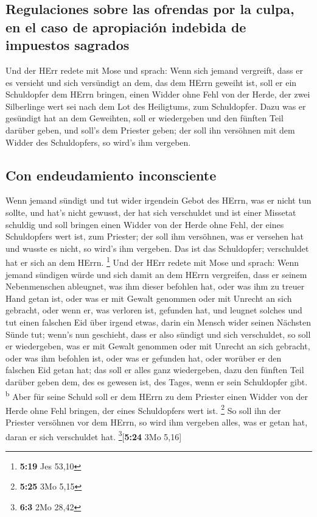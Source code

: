 \hypertarget{regulaciones-sobre-las-ofrendas-por-la-culpa-en-el-caso-de-apropiaciuxf3n-indebida-de-impuestos-sagrados}{%
\subsection{Regulaciones sobre las ofrendas por la culpa, en el caso de
apropiación indebida de impuestos
sagrados}\label{regulaciones-sobre-las-ofrendas-por-la-culpa-en-el-caso-de-apropiaciuxf3n-indebida-de-impuestos-sagrados}}

 Und der HErr redete mit Mose und sprach: 
Wenn sich jemand vergreift, dass er es versieht und sich versündigt an
dem, das dem HErrn geweiht ist, soll er ein Schuldopfer dem HErrn
bringen, einen Widder ohne Fehl von der Herde, der zwei Silberlinge wert
sei nach dem Lot des Heiligtums, zum Schuldopfer.  Dazu
was er gesündigt hat an dem Geweihten, soll er wiedergeben und den
fünften Teil darüber geben, und soll's dem Priester geben; der soll ihn
versöhnen mit dem Widder des Schuldopfers, so wird's ihm vergeben.

\hypertarget{con-endeudamiento-inconsciente}{%
\subsection{Con endeudamiento
inconsciente}\label{con-endeudamiento-inconsciente}}

 Wenn jemand sündigt und tut wider irgendein Gebot des
HErrn, was er nicht tun sollte, und hat's nicht gewusst, der hat sich
verschuldet und ist einer Missetat schuldig  und soll
bringen einen Widder von der Herde ohne Fehl, der eines Schuldopfers
wert ist, zum Priester; der soll ihm versöhnen, was er versehen hat und
wusste es nicht, so wird's ihm vergeben.  Das ist das
Schuldopfer; verschuldet hat er sich an dem HErrn. \footnote{\textbf{5:19}
  Jes 53,10}  Und der HErr redete mit Mose und sprach:
 Wenn jemand sündigen würde und sich damit an dem HErrn
vergreifen, dass er seinem Nebenmenschen ableugnet, was ihm dieser
befohlen hat, oder was ihm zu treuer Hand getan ist, oder was er mit
Gewalt genommen oder mit Unrecht an sich gebracht,  oder
wenn er, was verloren ist, gefunden hat, und leugnet solches und tut
einen falschen Eid über irgend etwas, darin ein Mensch wider seinen
Nächsten Sünde tut;  wenn's nun geschieht, dass er also
sündigt und sich verschuldet, so soll er wiedergeben, was er mit Gewalt
genommen oder mit Unrecht an sich gebracht, oder was ihm befohlen ist,
oder was er gefunden hat,  oder worüber er den falschen
Eid getan hat; das soll er alles ganz wiedergeben, dazu den fünften Teil
darüber geben dem, des es gewesen ist, des Tages, wenn er sein
Schuldopfer gibt. \textsuperscript{b}  Aber für seine
Schuld soll er dem HErrn zu dem Priester einen Widder von der Herde ohne
Fehl bringen, der eines Schuldopfers wert ist. \footnote{\textbf{5:25}
  3Mo 5,15}  So soll ihn der Priester versöhnen vor dem
HErrn, so wird ihm vergeben alles, was er getan hat, daran er sich
verschuldet hat. \footnote{\textbf{6:3} 2Mo 28,42}{[}\textbf{5:24} 3Mo
5,16{]}


